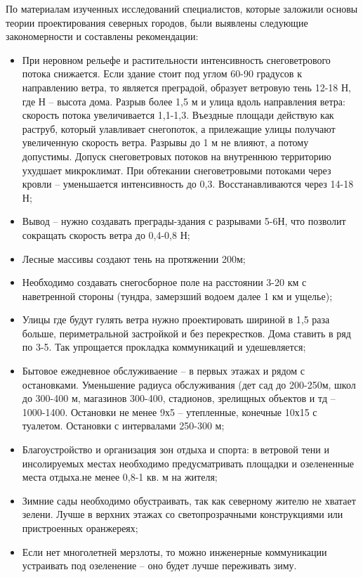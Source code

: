 
По материалам изученных исследований специалистов, которые заложили основы теории проектирования северных городов, были выявлены следующие закономерности и составлены рекомендации:
\begin{itemize}
    \item При неровном рельефе и растительности интенсивность снеговетрового потока снижается. Если здание стоит под углом 60-90 градусов к направлению ветра, то является преградой, образует ветровую тень 12-18 Н, где Н – высота дома. Разрыв более 1,5 м и улица вдоль направления ветра: скорость потока увеличивается 1,1-1,3. Въездные площади действую как раструб, который улавливает снегопоток, а прилежащие улицы получают увеличенную скорость ветра. Разрывы до 1 м не влияют, а потому допустимы. Допуск снеговетровых потоков на внутреннюю территорию ухудшает микроклимат. При обтекании снеговетровыми потоками через кровли – уменьшается интенсивность до 0,3. Восстанавливаются через 14-18 Н;
    \item Вывод – нужно создавать преграды-здания с разрывами 5-6Н, что позволит сокращать скорость ветра до 0,4-0,8 Н;
    \item Лесные массивы создают тень на протяжении 200м;
    \item Необходимо создавать снегосборное поле на расстоянии 3-20 км с наветренной стороны (тундра, замерзший водоем далее 1 км и ущелье);
    \item Улицы где будут гулять ветра нужно проектировать шириной в 1,5 раза больше, периметральной застройкой и без перекрестков. Дома ставить в ряд по 3-5. Так упрощается прокладка коммуникаций и удешевляется;
    \item Бытовое ежедневное обслуживаение – в первых этажах и рядом с остановками. Уменьшение радиуса обслуживания (дет сад до 200-250м, школ до 300-400 м, магазинов 300-400, стадионов, зрелищных объектов и тд – 1000-1400. Остановки не менее 9х5 – утепленные, конечные 10х15 с туалетом. Остановки с интервалами 250-300 м;
    \item Благоустройство и организация зон отдыха и спорта: в ветровой тени и инсолируемых местах необходимо предусматривать площадки и озелененные места отдыха.не менее 0,8-1 кв. м на жителя;
    \item Зимние сады необходимо обустраивать, так как северному жителю не хватает зелени. Лучше в верхних этажах со светопрозрачными конструкциями или пристроенных оранжереях;
    \item Если нет многолетней мерзлоты, то можно инженерные коммуникации устраивать под озеленение – оно будет лучше переживать зиму.
\end{itemize}

